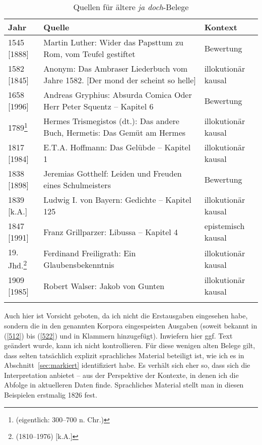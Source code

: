 \begin{table}
	\caption{\label{tab:523}Quellen für ältere \textit{ja doch}-Belege
}
     \begin{tabularx}{\linewidth}[t]{lXl}
     		\lsptoprule
     		Jahr & Quelle & Kontext\\
            \midrule
            1545 [1888] & Martin Luther: Wider das Papsttum zu Rom, vom Teufel gestiftet & Bewertung\\
            1582 [1845] & Anonym: Das Ambraser Liederbuch vom Jahre 1582. [Der mond der scheint so helle]  & 							illokutionär kausal\\
            1658 [1996] & Andreas Gryphius: Absurda Comica Oder Herr Peter Squentz – Kapitel 6  & Bewertung\\
            1789\footnote{(eigentlich: 300–700 n. Chr.)} & Hermes Trismegistos (dt.): Das andere Buch, Hermetis: Das Gemüt am Hermes & 					illokutionär kausal\\
            1817 [1984] & E.T.A. Hoffmann: Das Gelübde – Kapitel 1 & illokutionär kausal\\
            1838 [1898] & Jeremias Gotthelf: Leiden und Freuden eines Schulmeisters & Bewertung\\
            1839 [k.A.] & Ludwig I. von Bayern: Gedichte – Kapitel 125 & illokutionär kausal\\
            1847 [1991] & Franz Grillparzer: Libussa – Kapitel 4  & epistemisch kausal\\
            19. Jhd.\footnote{(1810–1976) [k.A.]} & Ferdinand Freiligrath: Ein Glaubensbekenntnis & illokutionär kausal\\
            1909 [1985] & Robert Walser: Jakob von Gunten & illokutionär kausal\\             
            \lspbottomrule
      \end{tabularx}
\end{table}
Auch hier ist Vorsicht geboten, da ich nicht die Erstausgaben eingesehen habe, sondern die in den genannten Korpora eingespeisten Ausgaben (soweit bekannt in (\ref{512}) bis (\ref{522}) und  in Klammern hinzugefügt). Inwiefern hier ggf. Text geändert wurde, kann ich nicht kontrollieren. Für diese wenigen alten Belege gilt, dass selten tatsächlich explizit sprachliches Material beteiligt ist, wie ich es in Abschnitt~\ref{sec:markiert} identifiziert habe. Es verhält sich eher so, dass sich die Interpretation anbietet – aus der Perspektive der Kontexte, in denen ich die Abfolge in aktuelleren Daten finde. Sprachliches Material stellt man in diesen Beispielen erstmalig 1826 fest. 

